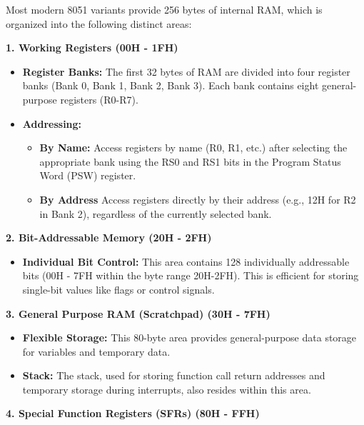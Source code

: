 \documentclass[
]{article}
\begin{document}
Most modern 8051 variants provide 256 bytes of internal RAM, which is
organized into the following distinct areas:

\textbf{1. Working Registers (00H - 1FH)}

\begin{itemize}
\item
  \textbf{Register Banks:} The first 32 bytes of RAM are divided into
  four register banks (Bank 0, Bank 1, Bank 2, Bank 3). Each bank
  contains eight general-purpose registers (R0-R7).
\item
  \textbf{Addressing:}

  \begin{itemize}
  \item
    \textbf{By Name:} Access registers by name (R0, R1, etc.) after
    selecting the appropriate bank using the RS0 and RS1 bits in the
    Program Status Word (PSW) register.
  \item
    \textbf{By Address} Access registers directly by their address
    (e.g., 12H for R2 in Bank 2), regardless of the currently selected
    bank.
  \end{itemize}
\end{itemize}

\textbf{2. Bit-Addressable Memory (20H - 2FH)}

\begin{itemize}
\item
  \textbf{Individual Bit Control:} This area contains 128 individually
  addressable bits (00H - 7FH within the byte range 20H-2FH). This is
  efficient for storing single-bit values like flags or control signals.
\end{itemize}

\textbf{3. General Purpose RAM (Scratchpad) (30H - 7FH)}

\begin{itemize}
\item
  \textbf{Flexible Storage:} This 80-byte area provides general-purpose
  data storage for variables and temporary data.
\item
  \textbf{Stack:} The stack, used for storing function call return
  addresses and temporary storage during interrupts, also resides within
  this area.
\end{itemize}

\textbf{4. Special Function Registers (SFRs) (80H - FFH)}
\end{document}

